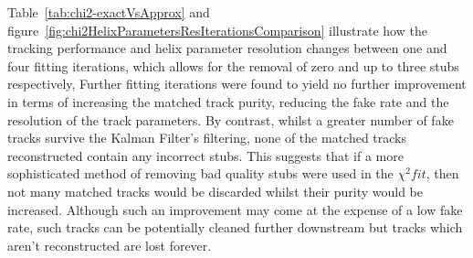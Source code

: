 Table~\ref{tab:chi2-exactVsApprox} and figure~\ref{fig:chi2HelixParametersResIterationsComparison} illustrate how the tracking performance and helix parameter resolution changes between one and four fitting iterations, which allows for the removal of zero and up to three stubs respectively, 
Further fitting iterations were found to yield no further improvement in terms of increasing the matched track purity, reducing the fake rate and the resolution of the track parameters.
By contrast, whilst a greater number of fake tracks survive the Kalman Filter's filtering, none of the matched tracks reconstructed contain any incorrect stubs. 
This suggests that if a more sophisticated method of removing bad quality stubs were used in the $\chi^{2} fit$, then  not many matched tracks would be discarded whilst their purity would be increased.
Although such an improvement may come at the expense of a low fake rate, such tracks can be potentially cleaned further downstream but tracks which aren't reconstructed are lost forever.

